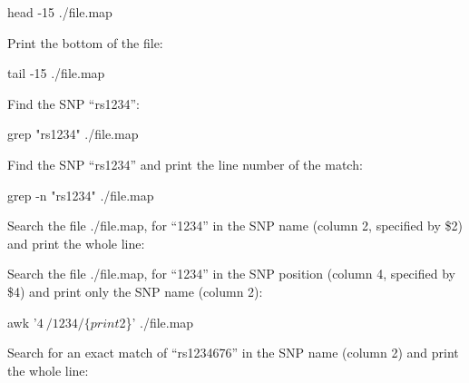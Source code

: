 \documentclass[]{book}
\newenvironment{Shaded}{\begin{snugshade}}{\end{snugshade}}
\newcommand{\StringTok}[1]{\textcolor[rgb]{0.31,0.60,0.02}{#1}}
\newcommand{\FunctionTok}[1]{\textcolor[rgb]{0.00,0.00,0.00}{#1}}
\newcommand{\NormalTok}[1]{#1}
\begin{document}
\begin{Shaded}
\begin{Highlighting}[]
\FunctionTok{head}\NormalTok{ -15 ./file.map}
\end{Highlighting}
\end{Shaded}

Print the bottom of the file:

\begin{Shaded}
\begin{Highlighting}[]
\FunctionTok{tail}\NormalTok{ -15 ./file.map}
\end{Highlighting}
\end{Shaded}

Find the SNP ``rs1234'':

\begin{Shaded}
\begin{Highlighting}[]
\FunctionTok{grep} \StringTok{"rs1234"}\NormalTok{ ./file.map}
\end{Highlighting}
\end{Shaded}

Find the SNP ``rs1234'' and print the line number of the match:

\begin{Shaded}
\begin{Highlighting}[]
\FunctionTok{grep}\NormalTok{ -n }\StringTok{"rs1234"}\NormalTok{ ./file.map}
\end{Highlighting}
\end{Shaded}

Search the file ./file.map, for ``1234'' in the SNP name (column 2,
specified by \$2) and print the whole line:

\begin{Shaded}
\end{Shaded}

Search the file ./file.map, for ``1234'' in the SNP position (column 4,
specified by \$4) and print only the SNP name (column 2):

\begin{Shaded}
\begin{Highlighting}[]
\FunctionTok{awk} \StringTok{'$4~/1234/\{print $2\}'}\NormalTok{ ./file.map}
\end{Highlighting}
\end{Shaded}

Search for an exact match of ``rs1234676'' in the SNP name (column 2)
and print the whole line:
\end{document}
